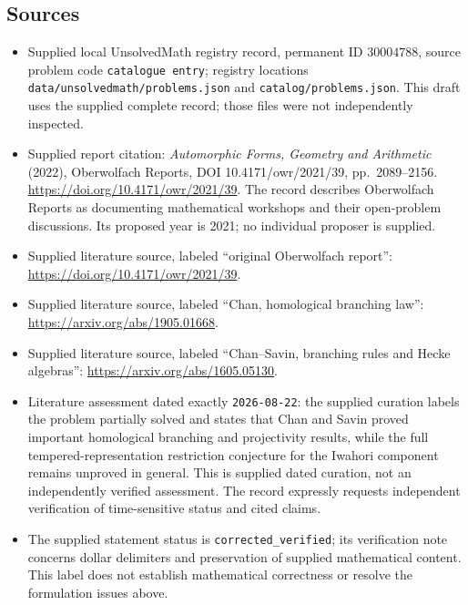 \documentclass[11pt]{article}
\begin{document}
\subsection{Sources}
\begin{itemize}
\item Supplied local UnsolvedMath registry record, permanent ID \(30004788\), source problem code \texttt{catalogue entry}; registry locations \texttt{data/unsolvedmath/problems.json} and \texttt{catalog/problems.json}. This draft uses the supplied complete record; those files were not independently inspected.
\item Supplied report citation: \emph{Automorphic Forms, Geometry and Arithmetic} (2022), Oberwolfach Reports, DOI 10.4171/owr/2021/39, pp.\ 2089--2156. \url{https://doi.org/10.4171/owr/2021/39}. The record describes Oberwolfach Reports as documenting mathematical workshops and their open-problem discussions. Its proposed year is 2021; no individual proposer is supplied.
\item Supplied literature source, labeled ``original Oberwolfach report'': \url{https://doi.org/10.4171/owr/2021/39}.
\item Supplied literature source, labeled ``Chan, homological branching law'': \url{https://arxiv.org/abs/1905.01668}.
\item Supplied literature source, labeled ``Chan--Savin, branching rules and Hecke algebras'': \url{https://arxiv.org/abs/1605.05130}.
\item Literature assessment dated exactly \texttt{2026-08-22}: the supplied curation labels the problem partially solved and states that Chan and Savin proved important homological branching and projectivity results, while the full tempered-representation restriction conjecture for the Iwahori component remains unproved in general. This is supplied dated curation, not an independently verified assessment. The record expressly requests independent verification of time-sensitive status and cited claims.
\item The supplied statement status is \texttt{corrected\_verified}; its verification note concerns dollar delimiters and preservation of supplied mathematical content. This label does not establish mathematical correctness or resolve the formulation issues above.
\end{itemize}
\end{document}

